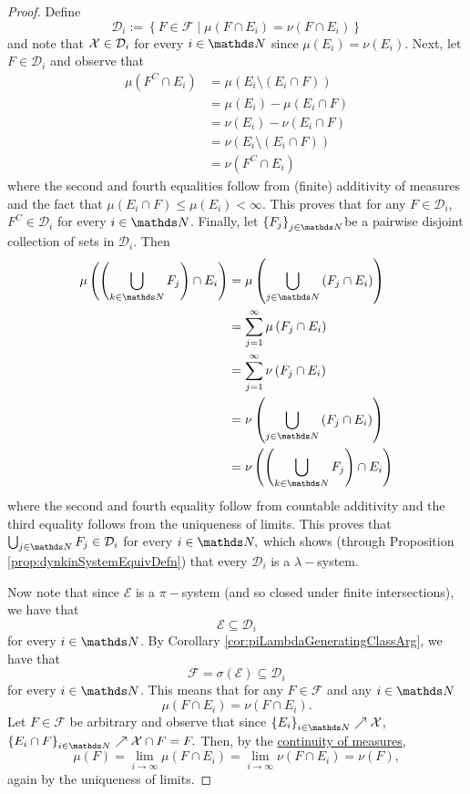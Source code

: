 \begin{proof}
Define
\[
\mathcal{D}_{i}:=\left\{ F\in\mathcal{F}\mid\mu\left(F\cap E_{i}\right)=\nu\left(F\cap E_{i}\right)\right\} 
\]
and note that $\mathcal{X}\in\mathcal{D}_{i}$ for every $i\in\N$ since $\mu\left(E_{i}\right)=\nu\left(E_{i}\right)$.
Next, let $F\in\mathcal{D}_{i}$ and observe that 
\begin{align*}
\mu\left(F^{C}\cap E_{i}\right) & =\mu\left(E_{i}\setminus\left(E_{i}\cap F\right)\right)\\
 & =\mu\left(E_{i}\right)-\mu\left(E_{i}\cap F\right)\\
 & =\nu\left(E_{i}\right)-\nu\left(E_{i}\cap F\right)\\
 & =\nu\left(E_{i}\setminus\left(E_{i}\cap F\right)\right)\\
 & =\nu\left(F^{C}\cap E_{i}\right)
\end{align*}
where the second and fourth equalities follow from (finite) additivity
of measures and the fact that $\mu\left(E_{i}\cap F\right)\leq\mu\left(E_{i}\right)<\infty$.
This proves that for any $F\in\mathcal{D}_{i}$, $F^{C}\in\mathcal{D}_{i}$
for every $i\in\N$. Finally, let $\left\{ F_{j}\right\} _{j\in\N}$be
a pairwise disjoint collection of sets in $\mathcal{D}_{i}$. Then
\begin{align*}
\mu\left(\left(\bigcup_{k\in\N}F_{j}\right)\cap E_{i}\right) & =\mu\left(\bigcup_{j\in\N}\left(F_{j}\cap E_{i}\right)\right)\\
 & =\sum_{j=1}^{\infty}\mu\left(F_{j}\cap E_{i}\right)\\
 & =\sum_{j=1}^{\infty}\nu\left(F_{j}\cap E_{i}\right)\\
 & =\nu\left(\bigcup_{j\in\N}\left(F_{j}\cap E_{i}\right)\right)\\
 & =\nu\left(\left(\bigcup_{k\in\N}F_{j}\right)\cap E_{i}\right)
\end{align*}
where the second and fourth equality follow from countable additivity
and the third equality follows from the uniqueness of limits. This
proves that $\bigcup_{j\in\N}F_{j}\in\mathcal{D}_{i}$ for every $i\in\N,$
which shows (through Proposition \ref{prop:dynkinSystemEquivDefn})
that every $\mathcal{D}_{i}$ is a $\lambda-$system.

Now note that since $\mathcal{E}$ is a $\pi-$system (and so closed
under finite intersections), we have that 
\[
\mathcal{E}\subseteq\mathcal{D}_{i}
\]
for every $i\in\N$. By Corollary \ref{cor:piLambdaGeneratingClassArg},
we have that 
\[
\mathcal{F}=\sigma\left(\mathcal{E}\right)\subseteq\mathcal{D}_{i}
\]
for every $i\in\N$. This means that for any $F\in\mathcal{F}$ and
any $i\in\N$
\[
\mu\left(F\cap E_{i}\right)=\nu\left(F\cap E_{i}\right).
\]
Let $F\in\mathcal{F}$ be arbitrary and observe that since $\left\{ E_{i}\right\} _{i\in\N}\nearrow\X$,
$\left\{ E_{i}\cap F\right\} _{i\in\N}\nearrow\X\cap F=F.$ Then,
by the \hyperref[prop:measureProperties]{continuity of measures},
\[
\mu\left(F\right)=\lim_{i\to\infty}\mu\left(F\cap E_{i}\right)=\lim_{i\to\infty}\nu\left(F\cap E_{i}\right)=\nu\left(F\right),
\]
again by the uniqueness of limits.
\end{proof}

